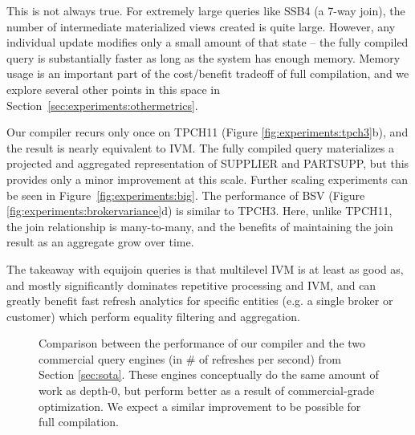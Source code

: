 This is not always true.  For extremely large queries like SSB4 (a 7-way join), the number of intermediate materialized views created is quite large.  However, any individual update modifies only a small amount of that state -- the fully compiled query is substantially faster as long as the system has enough memory.    Memory usage is an important part of the cost/benefit tradeoff of full compilation, and we explore several other points in this space in Section~\ref{sec:experiments:othermetrics}.  

Our compiler recurs only once on TPCH11 (Figure \ref{fig:experiments:tpch3}b), and the result is nearly equivalent to IVM.  The fully compiled query materializes a projected and aggregated representation of SUPPLIER and PARTSUPP, but this provides only a minor improvement at this scale. Further scaling experiments can be seen in Figure~\ref{fig:experiments:big}.
The performance of BSV (Figure \ref{fig:experiments:brokervariance}d) is similar to TPCH3. Here, unlike TPCH11, the join relationship is many-to-many, and the benefits of maintaining the join result as an aggregate grow over time.

The takeaway with equijoin queries is that multilevel IVM is at least as good as, and mostly significantly dominates repetitive processing and IVM, and can greatly benefit fast refresh analytics for specific entities (e.g. a single broker or customer) which perform equality filtering and aggregation.

\begin{figure}
\begin{center}
\resizebox{3.3in}{!}{

}
\caption{Comparison between the performance of our compiler and the two commercial query engines (in \# of refreshes per second) from Section \ref{sec:sota}.  These engines conceptually do the same amount of work as depth-0, but perform better as a result of commercial-grade optimization.  We expect a similar improvement to be possible for full compilation.}
\label{fig:experiments:enginesVsDBT}
\vspace*{-0.3in}
\end{center}
\end{figure}

